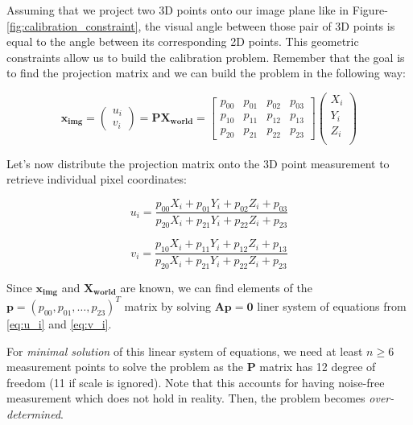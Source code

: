 \documentclass[a4paper]{report}
\numberwithin{figure}{section}
\begin{document}
Assuming that we project two 3D points onto our image plane
like in Figure-\ref{fig:calibration_constraint},
the visual angle between those pair of 3D points is equal to 
the angle between its corresponding 2D points. This geometric constraints 
allow us to build the calibration problem. Remember that the goal is to find 
the projection matrix and we can build the problem in the following way:

\begin{equation}
  \mathbf{x_{img}} = 
  \begin{pmatrix}
    u_i\\
    v_i
  \end{pmatrix}
  =
  \mathbf{P}\mathbf{X_{world}} = 
  \begin{bmatrix}
    p_{00} & p_{01} & p_{02} & p_{03}\\
    p_{10} & p_{11} & p_{12} & p_{13}\\
    p_{20} & p_{21} & p_{22} & p_{23}
  \end{bmatrix}
  \begin{pmatrix}
    X_i\\
    Y_i\\
    Z_i\\
  \end{pmatrix}
\end{equation} \label{eq:proj_matrix}

Let's now distribute 
the projection matrix onto the 3D point measurement to retrieve individual 
pixel coordinates:

\begin{equation}
  u_i = 
  \frac
  {p_{00}X_i + p_{01}Y_i + p_{02}Z_i + p_{03}}
  {p_{20}X_i + p_{21}Y_i + p_{22}Z_i + p_{23}}
\end{equation} \label{eq:u_i}

\begin{equation}
  v_i = 
  \frac
  {p_{10}X_i + p_{11}Y_i + p_{12}Z_i + p_{13}}
  {p_{20}X_i + p_{21}Y_i + p_{22}Z_i + p_{23}}
\end{equation} \label{eq:v_i}


Since $\mathbf{x_{img}}$ and $\mathbf{X_{world}}$ are known,
we can find elements of the $\mathbf{p} = (p_{00}, p_{01}, \dots, p_{23})^T$ matrix 
by solving $\mathbf{Ap=0}$ liner system of equations from \ref{eq:u_i} and \ref{eq:v_i}.

For \textit{minimal solution} of this linear system of equations, 
we need at least $n \geq 6$ measurement points to solve the problem as 
the $\mathbf{P}$ matrix has 12 degree of freedom (11 if scale is ignored).
Note that this accounts for having 
noise-free measurement which does not hold in reality. Then, the problem 
becomes \textit{over-determined}.
\end{document}
